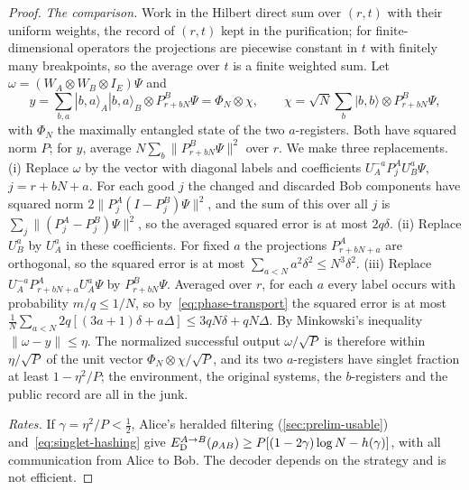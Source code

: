 \begin{proof}
\emph{The comparison.} Work in the Hilbert direct sum over $(r,t)$ with their uniform weights, the record of $(r,t)$ kept in the
purification; for finite-dimensional operators the projections are piecewise constant in $t$ with finitely many breakpoints, so
the average over $t$ is a finite weighted sum. Let $\omega=(W_A\otimes W_B\otimes I_E)\Psi$ and
\[
y=\sum_{b,a}|b,a\rangle_A|b,a\rangle_B\otimes P^B_{r+bN}\Psi=\Phi_N\otimes\chi,\qquad\chi=\sqrt N\sum_b|b,b\rangle\otimes P^B_{r+bN}\Psi,
\]
with $\Phi_N$ the maximally entangled state of the two $a$-registers. Both have squared norm $P$; for $y$, average
$N\sum_b\|P^B_{r+bN}\Psi\|^2$ over $r$. We make three replacements.
(i) Replace $\omega$ by the vector with diagonal labels and coefficients $U_A^{-a}P^A_jU_B^a\Psi$, $j=r+bN+a$. For each good $j$ the
changed and discarded Bob components have squared norm $2\|P^A_j(I-P^B_j)\Psi\|^2$, and the sum of this over all $j$ is
$\sum_j\|(P^A_j-P^B_j)\Psi\|^2$, so the averaged squared error is at most $2q\delta$.
(ii) Replace $U_B^a$ by $U_A^a$ in these coefficients. For fixed $a$ the projections $P^A_{r+bN+a}$ are orthogonal, so the squared
error is at most $\sum_{a<N}a^2\delta^2\le N^3\delta^2$.
(iii) Replace $U_A^{-a}P^A_{r+bN+a}U_A^a\Psi$ by $P^B_{r+bN}\Psi$. Averaged over $r$, for each $a$ every label occurs with probability
$m/q\le1/N$, so by~\eqref{eq:phase-transport} the squared error is at most
$\frac1N\sum_{a<N}2q[(3a+1)\delta+a\Delta]\le3qN\delta+qN\Delta$.
By Minkowski's inequality $\|\omega-y\|\le\eta$. The normalized successful output $\omega/\sqrt P$ is therefore within $\eta/\sqrt P$ of the
unit vector $\Phi_N\otimes\chi/\sqrt P$, and its two $a$-registers have singlet fraction at least $1-\eta^2/P$; the environment, the
original systems, the $b$-registers and the public record are all in the junk.

\emph{Rates.} If $\gamma=\eta^2/P<\frac12$, Alice's heralded filtering (\cref{sec:prelim-usable}) and~\eqref{eq:singlet-hashing} give
$E_{\mathrm D}^{A\to B}(\rho_{AB})\ge P[(1-2\gamma)\log N-h(\gamma)]$, with all communication from Alice to Bob. The decoder depends on the
strategy and is not efficient.


\end{proof}
